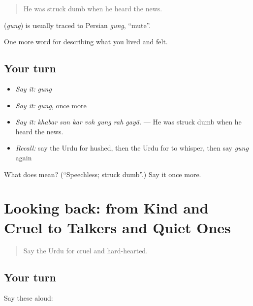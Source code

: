 \begin{quote}
He was struck dumb when he heard the news.
\end{quote}

\begin{cousinweb}
\textbf{} (\emph{gung}) is usually traced to Persian \emph{gung}, \textquotedblleft{}mute\textquotedblright{}.
\end{cousinweb}

\begin{grammarlens}[title={What you've built}]
One more word for describing what you lived and felt.
\end{grammarlens}

\subsection*{Your turn}
\begin{itemize}
\raggedright
  \item \emph{Say it:} \emph{gung}
  \item \emph{Say it:} \emph{gung}, once more
  \item \emph{Say it:} \emph{khabar sun kar voh gung rah gayā.} — He was struck dumb when he heard the news.
  \item \emph{Recall:} say the Urdu for hushed, then the Urdu for to whisper, then say \emph{gung} again
\end{itemize}

\begin{tcolorbox}[breakable,colback=teal!4,colframe=teal!35!black,title={Before you move on}]
What does  mean? (\textquotedblleft{}Speechless; struck dumb\textquotedblright{}.) Say it once more.
\end{tcolorbox}
\section[(dialogue)]{Looking back: from Kind and Cruel to Talkers and Quiet Ones}

\label{lesson:UR-R463-review-456-463}



\begin{quote}
Say the Urdu for cruel and hard-hearted.
\end{quote}

\subsection*{Your turn}
Say these aloud:

